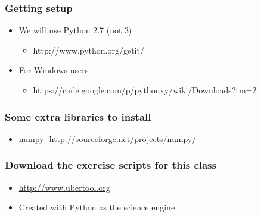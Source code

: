 \documentclass{beamer}
\begin{document}
\begin{frame}[fragile]
\frametitle{Getting setup}
\begin{itemize}
  \item{We will use Python 2.7 (not 3)}
  \begin{itemize}
  \item http://www.python.org/getit/
  \end{itemize}
  \item{For Windows users} 
  \begin{itemize}
  \item https://code.google.com/p/pythonxy/wiki/Downloads?tm=2
   \end{itemize}
\end{itemize} 
\end{frame}


\begin{frame}[fragile]
\frametitle{Some extra libraries to install}
\begin{itemize}
  \item{numpy- http://sourceforge.net/projects/numpy/}
\end{itemize} 
\end{frame}


\begin{frame}[fragile]
\frametitle{Download the exercise scripts for this class}
\begin{itemize}
  \item \href{http://www.ubertool.org}{http://www.ubertool.org}
  \item Created with Python as the science engine
\end{itemize} 
\end{frame}
\end{document}
